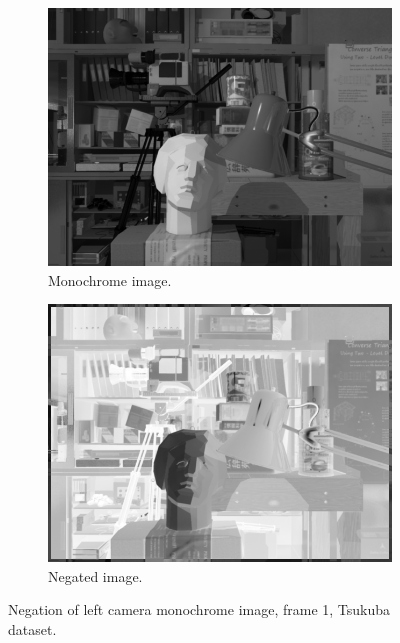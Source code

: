 \begin{figure}[!htbp]
\captionsetup{justification=centering}
\captionsetup[subfigure]{justification=centering}
\begin{subfigure}{.5\textwidth}
  \centering
  \includegraphics[width=.8\linewidth]{figures/frame_1_monochrome}
  \caption{Monochrome image.}
  \label{fig:sfig1}
\end{subfigure}%
\begin{subfigure}{.5\textwidth}
  \centering
  \includegraphics[width=.8\linewidth]{figures/negated}
  \caption{Negated image.}
  \label{fig:sfig2}
\end{subfigure}
\caption{Negation of left camera monochrome image, frame 1, Tsukuba dataset.}
\label{fig:negation}
\end{figure}


